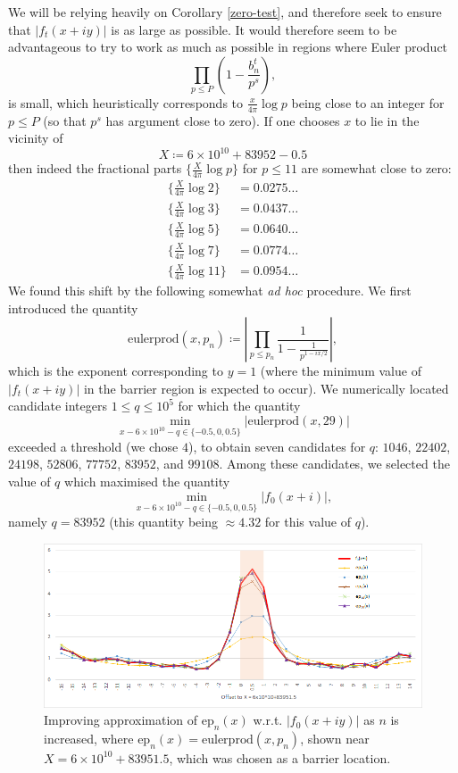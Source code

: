 \documentclass[a4paper,11pt,twoside]{amsart}
\begin{document}
We will be relying heavily on Corollary \ref{zero-test}, and therefore seek to ensure that $|f_t(x+iy)|$ is as large as possible.
It would therefore seem to be advantageous to try to work as much as possible in regions where Euler product
$$ \prod_{p \leq P} \left(1 - \frac{b_n^t}{p^s}\right),$$
is small, which heuristically corresponds to $\frac{x}{4\pi} \log p$ being close to an integer for $p \leq P$ (so that $p^s$ has argument close to zero).  If one chooses $x$ to lie in the vicinity of
$$ X \coloneqq 6 \times 10^{10} + 83952 - 0.5$$
then indeed the fractional parts $\{ \frac{X}{4\pi} \log p\}$ for $p \leq 11$ are somewhat close to zero:
\begin{align*}
\{ \frac{X}{4\pi} \log 2 \} &= 0.0275\dots \\
\{ \frac{X}{4\pi} \log 3 \} &= 0.0437\dots \\
\{ \frac{X}{4\pi} \log 5 \} &= 0.0640\dots \\
\{ \frac{X}{4\pi} \log 7 \} &= 0.0774\dots\\
\{ \frac{X}{4\pi} \log 11 \} &= 0.0954\dots
\end{align*}
We found this shift by the following somewhat \emph{ad hoc} procedure.  We first introduced the quantity
$$ \mathrm{eulerprod}(x,p_n) \coloneqq \left|\prod\limits_{p \leq p_n}\frac{1}{1-\frac{1}{p^{1-ix/2}}}\right|,$$
which is the  exponent corresponding to $y=1$ (where the minimum value of $|f_t(x+iy)|$ in the barrier region is expected to occur).  We numerically located candidate integers $1 \leq q \leq 10^5$ for which the quantity
$$ \min_{x - 6 \times 10^{10} - q \in \{-0.5,0,0.5\}} |\mathrm{eulerprod}(x,29)|$$
exceeded a threshold (we chose $4$), to obtain seven candidates for $q$: $1046$, $22402$, $24198$, $52806$, $77752$, $83952$, and $99108$.  Among these candidates, we selected the value of $q$ which maximised the quantity
$$ \min_{x - 6 \times 10^{10} - q \in \{-0.5,0,0.5\}} |f_0(x+i)|,$$
namely $q = 83952$ (this quantity being $\approx 4.32$ for this value of $q$).
\begin{figure}[ht!]
  \includegraphics[width=\linewidth]{euler_product_approximation.png}
  \caption{Improving approximation of $\mathrm{ep}_n(x)$ w.r.t. $|f_0(x+iy)|$ as $n$ is increased, where $\mathrm{ep}_n(x)=\mathrm{eulerprod}(x,p_n)$, shown near $X=6 \times 10^{10} + 83951.5$, which was chosen as a barrier location.}
	\label{euler}
\end{figure}
\end{document}
